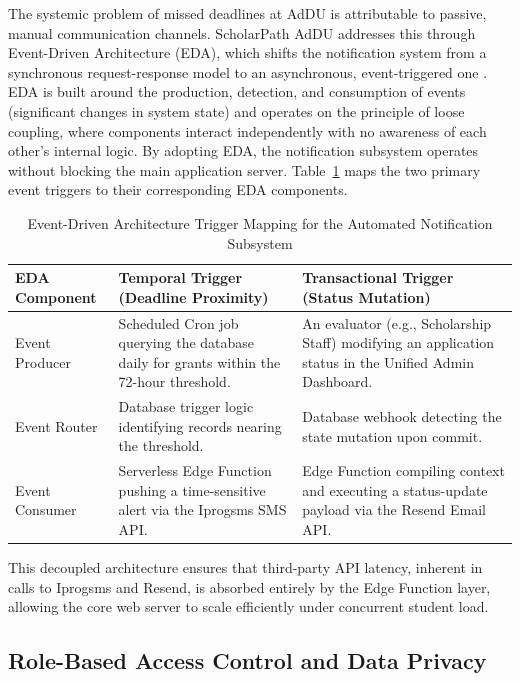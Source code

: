The systemic problem of missed deadlines at AdDU is attributable to passive, manual communication channels. ScholarPath AdDU addresses this through Event-Driven Architecture (EDA), which shifts the notification system from a synchronous request-response model to an asynchronous, event-triggered one \cite{ref28}. EDA is built around the production, detection, and consumption of events (significant changes in system state) and operates on the principle of loose coupling, where components interact independently with no awareness of each other's internal logic. By adopting EDA, the notification subsystem operates without blocking the main application server. Table~\ref{tab:eda} maps the two primary event triggers to their corresponding EDA components. \begin{table}[htbp]
  \centering
  \small
  \caption{Event-Driven Architecture Trigger Mapping for the Automated Notification Subsystem}
  \label{tab:eda}
  \begin{tabular}{@{}p{3.0cm} p{5.4cm} p{5.4cm}@{}}
    \toprule
    EDA Component & Temporal Trigger (Deadline Proximity) & Transactional Trigger (Status Mutation) \\
    \midrule
    Event Producer & Scheduled Cron job querying the database daily for grants within the 72-hour threshold. & An evaluator (e.g., Scholarship Staff) modifying an application status in the Unified Admin Dashboard. \\
    \addlinespace
    Event Router & Database trigger logic identifying records nearing the threshold. & Database webhook detecting the state mutation upon commit. \\
    \addlinespace
    Event Consumer & Serverless Edge Function pushing a time-sensitive alert via the Iprogsms SMS API. & Edge Function compiling context and executing a status-update payload via the Resend Email API. \\
    \bottomrule
  \end{tabular}
\end{table}
 This decoupled architecture ensures that third-party API latency, inherent in calls to Iprogsms and Resend, is absorbed entirely by the Edge Function layer, allowing the core web server to scale efficiently under concurrent student load.

\subsection{Role-Based Access Control and Data Privacy}

